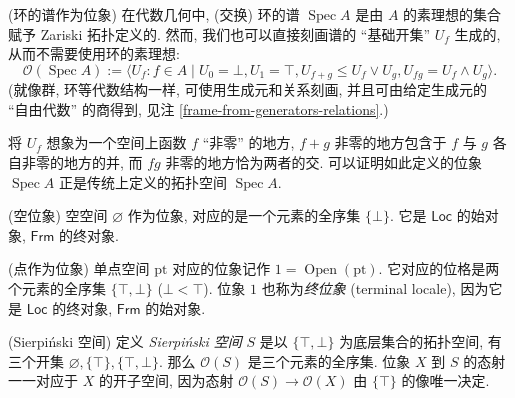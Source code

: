 \begin{example}
	[label={spectrum-as-locale}]
	{(环的谱作为位象)}
	在代数几何中, (交换) 环的谱 $\operatorname{Spec}A$ 是由 $A$ 的素理想的集合赋予 Zariski 拓扑定义的. 然而, 我们也可以直接刻画谱的 ``基础开集'' $U_f$ 生成的\fm, 从而不需要使用环的素理想\footnotemark:
	$$
	\mathcal O(\operatorname{Spec}A):= \big\langle U_f\colon f\in A\mid U_0 = \bot, U_1 = \top,
	U_{f+g} \leq U_f \vee U_g, U_{fg} = U_f \wedge U_g \big\rangle.
	$$
	(\fm{}就像群, 环等代数结构一样, 可使用生成元和关系刻画, 并且可由给定生成元的 ``自由代数'' 的商得到, 见注 \ref{frame-from-generators-relations}.)
	
	将 $U_f$ 想象为一个空间上函数 $f$ ``非零'' 的地方,
	$f+g$ 非零的地方包含于 $f$ 与 $g$ 各自非零的地方的并,
	而 $fg$ 非零的地方恰为两者的交.
	可以证明如此定义的位象 $\operatorname{Spec}A$ 正是传统上定义的拓扑空间 $\operatorname{Spec}A$.
\end{example}


\begin{example}
	[label={initial-locale}]
	{(空位象)}
	空空间 $\varnothing$ 作为位象, 对应的\fm{}是一个元素的全序集 $\{\bot\}$.
	它是 $\mathsf {Loc}$ 的始对象, $\mathsf {Frm}$ 的终对象.
\end{example}

\begin{example}
	[label={terminal-locale}]
	{(点作为位象)}
	单点空间 $\text{pt}$ 对应的位象记作 $1 = \operatorname{Open}(\text{pt})$.
	它对应的位格是两个元素的全序集 $\{\top,\bot\}$ ($\bot < \top$).
	位象 $1$ 也称为\emph{终位象} (terminal locale), 因为它是 $\mathsf {Loc}$ 的终对象, $\mathsf {Frm}$ 的始对象.
\end{example}

\begin{example}
	[label={Sierpinski-space-locale-example}]
	{(Sierpi\'nski 空间)}
	定义 \emph{Sierpi\'nski 空间} $S$ 是以 $\{\top,\bot\}$ 为底层集合的拓扑空间, 有三个开集 $\varnothing, \{\top\}, \{\top,\bot\}$. 那么 $\mathcal O(S)$ 是三个元素的全序集.
	位象 $X$ 到 $S$ 的态射一一对应于 $X$ 的开子空间, 因为\fm{}态射  $\mathcal O(S)\to\mathcal O(X)$ 由 $\{\top\}$ 的像唯一决定.
\end{example}

